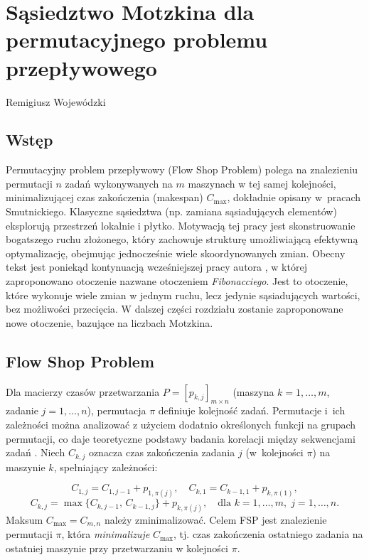 \chapter[Sąsiedztwo Motzkina \ldots]{Sąsiedztwo Motzkina dla permutacyjnego problemu przepływowego}
\thispagestyle{empty}
\vspace{-8mm} {\large Remigiusz Wojewódzki} \vspace{8mm}

\section{Wstęp}

Permutacyjny problem przepływowy (Flow Shop Problem) polega na znalezieniu permutacji $n$ zadań wykonywanych na $m$ maszynach w tej samej kolejności, minimalizującej czas zakończenia (makespan) $C_{\max}$, dokładnie opisany w~pracach Smutnickiego\cite{smutnicki2012, nowicki1996fast}. Klasyczne sąsiedztwa (np. zamiana sąsiadujących elementów) eksplorują przestrzeń lokalnie i płytko. Motywacją tej pracy jest skonstruowanie bogatszego ruchu złożonego, który zachowuje strukturę umożliwiającą efektywną optymalizację, obejmując jednocześnie wiele skoordynowanych zmian. Obecny tekst jest poniekąd kontynuacją wcześniejszej pracy autora \cite{Fibona}, w której zaproponowano otoczenie nazwane otoczeniem \emph{Fibonacciego}. Jest to otoczenie, które wykonuje wiele zmian w jednym ruchu, lecz jedynie sąsiadujących wartości, bez możliwości przecięcia. W dalszej części rozdziału zostanie zaproponowane nowe otoczenie, bazujące na liczbach Motzkina.

\section{Flow Shop Problem}

Dla macierzy czasów przetwarzania \(P = [p_{k,j}]_{m \times n}\) (maszyna \(k=1,\dots,m\), zadanie \(j=1,\dots,n\)), permutacja \(\pi\) definiuje kolejność zadań. Permutacje i~ich zależności można analizować z użyciem dodatnio określonych funkcji na grupach permutacji, co daje teoretyczne podstawy badania korelacji między sekwencjami zadań \cite{Bozejko2015}. Niech \(C_{k,j}\) oznacza czas zakończenia zadania \(j\) (w~kolejności \(\pi\)) na maszynie \(k\), spełniający zależności:


\begin{equation}\label{eq_c_ij&eq_c_k1}
C_{1,j} = C_{1,j-1} + p_{1,\pi(j)},\quad
C_{k,1} = C_{k-1,1} + p_{k,\pi(1)},
\end{equation}
\begin{equation}\label{eq_c_kj}
C_{k,j} = \max\{C_{k,j-1},\, C_{k-1,j}\} + p_{k,\pi(j)}, \quad \text{dla } k=1,\dots,m,\; j=1,\dots,n.
\end{equation}
Maksum \(C_{\max} = C_{m,n}\) należy zminimalizować. Celem FSP jest znalezienie permutacji \(\pi\), która \emph{minimalizuje} \(C_{\max}\), tj. czas zakończenia ostatniego zadania na ostatniej maszynie przy przetwarzaniu w kolejności \(\pi\).

